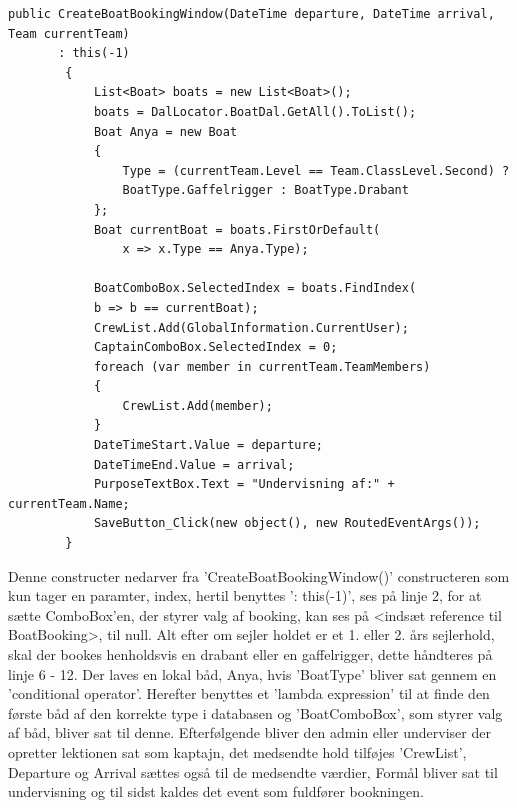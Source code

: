 \begin{lstlisting}[caption={Dette kode bliver indirekte udført når der trykkes på 'OK' knappen, og opretter en bådreservation for lektionen.},
label=IndirekteBook]
public CreateBoatBookingWindow(DateTime departure, DateTime arrival, Team currentTeam) 
	   : this(-1)
        {
            List<Boat> boats = new List<Boat>();
            boats = DalLocator.BoatDal.GetAll().ToList();
            Boat Anya = new Boat
            {
                Type = (currentTeam.Level == Team.ClassLevel.Second) ?
                BoatType.Gaffelrigger : BoatType.Drabant
            };
            Boat currentBoat = boats.FirstOrDefault(
                x => x.Type == Anya.Type);

            BoatComboBox.SelectedIndex = boats.FindIndex(
            b => b == currentBoat);
            CrewList.Add(GlobalInformation.CurrentUser);
            CaptainComboBox.SelectedIndex = 0;
            foreach (var member in currentTeam.TeamMembers)
            {
                CrewList.Add(member);
            }
            DateTimeStart.Value = departure;
            DateTimeEnd.Value = arrival;
            PurposeTextBox.Text = "Undervisning af:" + currentTeam.Name;
            SaveButton_Click(new object(), new RoutedEventArgs());
        }
\end{lstlisting}
Denne constructer nedarver fra 'CreateBoatBookingWindow()' constructeren som kun tager en paramter, index, hertil benyttes ': this(-1)', ses på linje 2, for at sætte ComboBox'en, der styrer valg af booking, kan ses på <indsæt reference til BoatBooking>, til null.
Alt efter om sejler holdet er et 1. eller 2. års sejlerhold, skal der bookes henholdsvis en drabant eller en gaffelrigger, dette håndteres på linje 6 - 12. Der laves en lokal båd, Anya, hvis 'BoatType' bliver sat gennem en 'conditional operator'.
Herefter benyttes et 'lambda expression' til at finde den første båd af den korrekte type i databasen og 'BoatComboBox', som styrer valg af båd, bliver sat til denne.
Efterfølgende bliver den admin eller underviser der opretter lektionen sat som kaptajn, det medsendte hold tilføjes 'CrewList', Departure og Arrival sættes også til de medsendte værdier, Formål bliver sat til undervisning og til sidst kaldes det event som fuldfører bookningen.